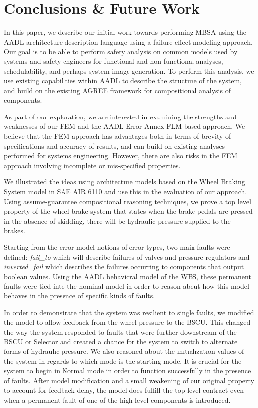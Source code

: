 \section{Conclusions \& Future Work}
In this paper, we describe our initial work towards performing MBSA using the AADL architecture description language using a failure effect modeling approach.  Our goal is to be able to perform safety analysis on common models used by systems and safety engineers for functional and non-functional analyses, schedulability, and perhaps system image generation.  To perform this analysis, we use existing capabilities within AADL to describe the structure of the system, and build on the existing AGREE framework for compositional analysis of components.  

As part of our exploration, we are interested in examining the strengths and weaknesses of our FEM and the AADL Error Annex FLM-based approach.  We believe that the FEM approach has advantages both in terms of brevity of specifications and accuracy of results, and can build on existing analyses performed for systems engineering.  However, there are also risks in the FEM approach involving incomplete or mis-specified properties.  

We illustrated the ideas using architecture models based on the Wheel Braking System model in SAE AIR 6110 \cite{AIR6110} and use this in the evaluation of our approach. Using assume-guarantee compositional reasoning techniques, we prove a top level property of the wheel brake system that states when the brake pedals are pressed in the absence of skidding, there will be hydraulic pressure supplied to the brakes.  

Starting from the error model notions of error types, two main faults were defined: \textit{fail\_to} which will describe failures of valves and pressure regulators and \textit{inverted\_fail} which describes the failures occurring to components that output boolean values. Using the AADL behavioral model of the WBS, these permanent faults were tied into the nominal model in order to reason about how this model behaves in the presence of specific kinds of faults.

In order to demonstrate that the system was resilient to single faults, we modified the model to allow feedback from the wheel pressure to the BSCU.   This changed the way the system responded to faults that were further downstream of the BSCU or Selector and created a chance for the system to switch to alternate forms of hydraulic pressure. We also reasoned about the initialization values of the system in regards to which mode is the starting mode. It is crucial for the system to begin in Normal mode in order to function successfully in the presence of faults.  After model modification and a small weakening of our original property to account for feedback delay, the model does fulfill the top level contract even when a permanent fault of one of the high level components is introduced.

